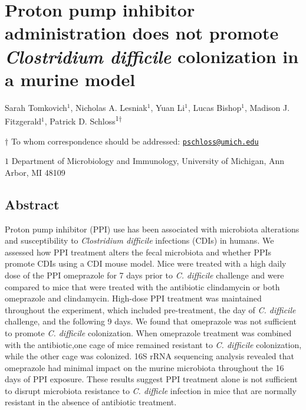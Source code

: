 \documentclass[11pt,]{article}
\title{}
\author{}
\date{}
\begin{document}
\vspace{35mm}

\section{\texorpdfstring{Proton pump inhibitor administration does not
promote \emph{Clostridium difficile} colonization in a murine
model}{Proton pump inhibitor administration does not promote Clostridium difficile colonization in a murine model}}\label{proton-pump-inhibitor-administration-does-not-promote-clostridium-difficile-colonization-in-a-murine-model}

\vspace{35mm}

Sarah Tomkovich\({^1}\), Nicholas A. Lesniak\({^1}\), Yuan Li\({^1}\),
Lucas Bishop\({^1}\), Madison J. Fitzgerald\({^1}\), Patrick D.
Schloss\textsuperscript{1\(\dagger\)}

\vspace{40mm}

\(\dagger\) To whom correspondence should be addressed:
\href{mailto:pschloss@umich.edu}{\nolinkurl{pschloss@umich.edu}}

\(1\) Department of Microbiology and Immunology, University of Michigan,
Ann Arbor, MI 48109

\newpage

\linenumbers

\subsection{Abstract}\label{abstract}

Proton pump inhibitor (PPI) use has been associated with microbiota
alterations and susceptibility to \emph{Clostridium difficile}
infections (CDIs) in humans. We assessed how PPI treatment alters the
fecal microbiota and whether PPIs promote CDIs using a CDI mouse model.
Mice were treated with a high daily dose of the PPI omeprazole for 7
days prior to \emph{C. difficile} challenge and were compared to mice
that were treated with the antibiotic clindamycin or both omeprazole and
clindamycin. High-dose PPI treatment was maintained throughout the
experiment, which included pre-treatment, the day of \emph{C. difficile}
challenge, and the following 9 days. We found that omeprazole was not
sufficient to promote \emph{C. difficile} colonization. When omeprazole
treatment was combined with the antibiotic,one cage of mice remained
resistant to \emph{C. difficile} colonization, while the other cage was
colonized. 16S rRNA sequencing analysis revealed that omeprazole had
minimal impact on the murine microbiota throughout the 16 days of PPI
exposure. These results suggest PPI treatment alone is not sufficient to
disrupt microbiota resistance to \emph{C. difficle} infection in mice
that are normally resistant in the absence of antibiotic treatment.
\end{document}
